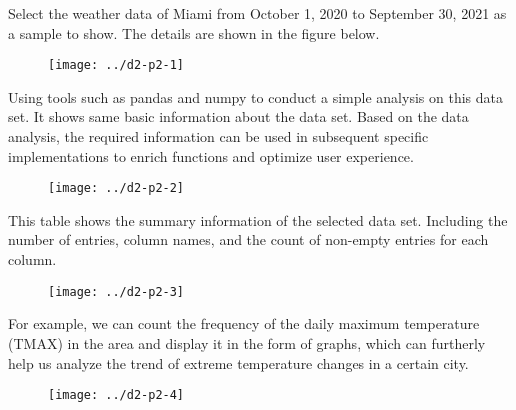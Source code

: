 \documentclass[]{article}
\begin{document}
	\noindent Select the weather data of Miami from October 1, 2020 to September 30, 2021 as a sample to show. The details are shown in the figure below. \\
	
	\begin{figure}[H]
		\centering
		\texttt{[image: ../d2-p2-1]}
		\caption{}
		\label{fig:d2-p2-1}
	\end{figure}
	
	\noindent Using tools such as pandas and numpy to conduct a simple analysis on this data set. It shows same basic information about the data set. Based on the data analysis, the required information can be used in subsequent specific implementations to enrich functions and optimize user experience. \\
	
	\begin{figure}[H]
		\centering
		\texttt{[image: ../d2-p2-2]}
		\caption{}
		\label{fig:d2-p2-2}
	\end{figure}
	
	
	\noindent This table shows the summary information of the selected data set. Including the number of entries, column names, and the count of non-empty entries for each column.  \\
	
	\begin{figure}[H]
		\centering
		\texttt{[image: ../d2-p2-3]}
		\caption{}
		\label{fig:d2-p2-3}
	\end{figure}
	
	\noindent For example, we can count the frequency of the daily maximum temperature (TMAX) in the area and display it in the form of graphs, which can furtherly help us analyze the trend of extreme temperature changes in a certain city.  \\
	\begin{figure}[H]
		\centering
		\texttt{[image: ../d2-p2-4]}
		\caption{}
		\label{fig:d2-p2-4}
	\end{figure}
	
	
	
	
\end{document}
